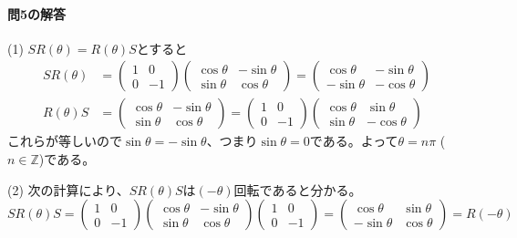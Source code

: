 \paragraph{問5の解答}

(1) $SR(\theta) = R(\theta)S$とすると
\begin{align*}
SR(\theta) &= 
\begin{pmatrix}
1 & 0 \\
0 & -1
\end{pmatrix}
\begin{pmatrix}
\cos\theta & -\sin\theta \\
\sin\theta & \cos\theta
\end{pmatrix}
=
\begin{pmatrix}
\cos\theta & -\sin\theta \\
-\sin\theta & -\cos\theta
\end{pmatrix}\\
R(\theta) S &= 
\begin{pmatrix}
\cos\theta & -\sin\theta \\
\sin\theta & \cos\theta
\end{pmatrix} =
\begin{pmatrix}
1 & 0 \\
0 & -1
\end{pmatrix}
\begin{pmatrix}
\cos\theta & \sin\theta \\
\sin\theta & -\cos\theta
\end{pmatrix}
\end{align*}
これらが等しいので$\sin\theta = -\sin\theta$、つまり$\sin\theta = 0$である。よって$\theta = n\pi$ ($n\in\mathbb{Z}$)である。

\noindent (2) 次の計算により、$SR(\theta)S$は$(-\theta)$回転であると分かる。
\[
SR(\theta)S = 
\begin{pmatrix}
1 & 0 \\
0 & -1
\end{pmatrix}
\begin{pmatrix}
\cos\theta & -\sin\theta \\
\sin\theta & \cos\theta
\end{pmatrix}
\begin{pmatrix}
1 & 0 \\
0 & -1
\end{pmatrix}
=
\begin{pmatrix}
\cos\theta & \sin\theta \\
-\sin\theta & \cos\theta
\end{pmatrix}
= R(-\theta)
\]

